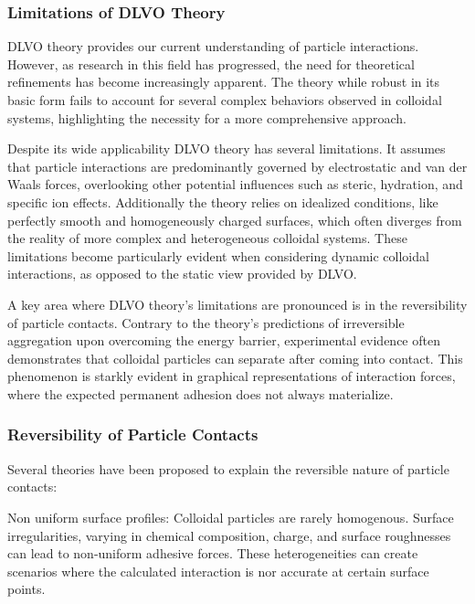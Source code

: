
%

\subsubsection{Limitations of DLVO Theory}

DLVO theory provides our current understanding of particle interactions. However, as research in this field has progressed, the need for theoretical refinements has become increasingly apparent. The theory while robust in its basic form fails to account for several complex behaviors observed in colloidal systems, highlighting the necessity for a more comprehensive approach.

Despite its wide applicability DLVO theory has several limitations. It assumes that particle interactions are predominantly governed by electrostatic and van der Waals forces, overlooking other potential influences such as steric, hydration, and specific ion effects. Additionally the theory relies on idealized conditions, like perfectly smooth and homogeneously charged surfaces, which often diverges from the reality of more complex and heterogeneous colloidal systems. These limitations become particularly evident when considering dynamic colloidal interactions, as opposed to the static view provided by DLVO.

A key area where DLVO theory's limitations are pronounced is in the reversibility of particle contacts. Contrary to the theory's predictions of irreversible aggregation upon overcoming the energy barrier, experimental evidence often demonstrates that colloidal particles can separate after coming into contact. \cite{DNACollid} This phenomenon is starkly evident in graphical representations of interaction forces, where the expected permanent adhesion does not always materialize.

\subsubsection{Reversibility of Particle Contacts}

Several theories have been proposed to explain the reversible nature of particle contacts:

Non uniform surface profiles: Colloidal particles are rarely homogenous. Surface irregularities, varying in chemical composition, charge, and surface roughnesses can lead to non-uniform adhesive forces. These heterogeneities can create scenarios where the calculated interaction is nor accurate at certain surface points.

